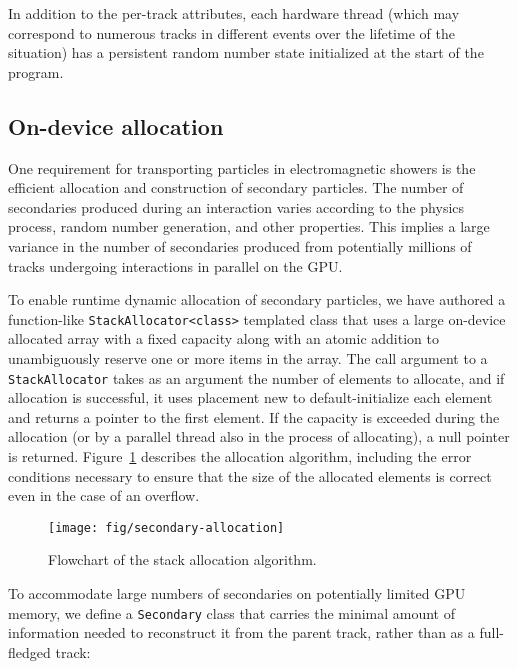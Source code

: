 In addition to the per-track attributes, each hardware thread
(which may correspond to numerous tracks in different events over the lifetime
of the situation) has a persistent random number state initialized at the start
of the program.

\subsection{On-device allocation}\label{on-device-allocation}

One requirement for transporting particles in electromagnetic showers is
the efficient allocation and construction of secondary particles. The
number of secondaries produced during an interaction varies according to
the physics process, random number generation, and other properties.
This implies a large variance in the number of secondaries produced from
potentially millions of tracks undergoing interactions in parallel on
the GPU.

To enable runtime dynamic allocation of secondary particles, we have
authored a function-like
\texttt{StackAllocator\textless{}class\textgreater{}} templated class
that uses a large on-device allocated array with a fixed capacity along
with an atomic addition to unambiguously reserve one or more items in
the array. The call argument to a \texttt{StackAllocator} takes as an
argument the number of elements to allocate, and if allocation is
successful, it uses placement new to default-initialize each element and
returns a pointer to the first element. If the capacity is exceeded
during the allocation (or by a parallel thread also in the process of
allocating), a null pointer is returned. Figure~\ref{fig:secondary} describes
the allocation algorithm, including the error conditions necessary to ensure
that the size of the allocated elements is correct even in the case of an
overflow.
%
\begin{figure}[htb]
  \centering
  \texttt{[image: fig/secondary-allocation]}
  \caption{Flowchart of the stack allocation algorithm.}
  \label{fig:secondary}
\end{figure}

To accommodate large numbers of secondaries on potentially limited GPU
memory, we define a \texttt{Secondary} class that carries the minimal
amount of information needed to reconstruct it from the parent track,
rather than as a full-fledged track:

\begin{Shaded}
\begin{Highlighting}[]
\NormalTok{\{}
\NormalTok{\};}
\end{Highlighting}
\end{Shaded}


